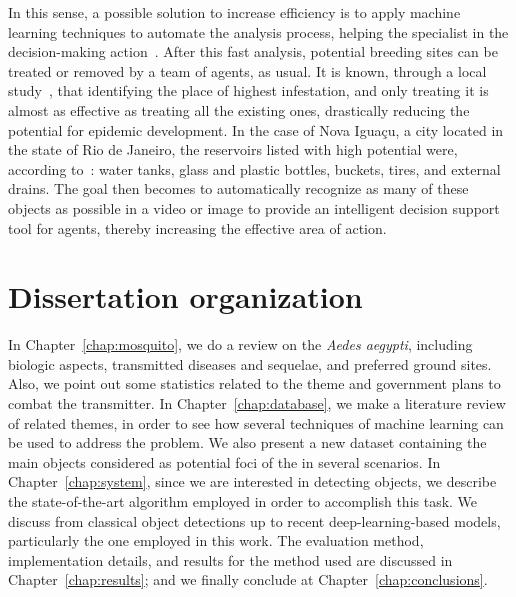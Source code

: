 In this sense, a possible solution to increase efficiency is to apply machine learning techniques to automate the analysis process, helping the specialist in the decision-making action~\cite{casfinal2018}. 
After this fast analysis, potential breeding sites can be treated or removed by a team of agents, as usual. 
It is known, through a local study~\cite{tun2009reducing}, that identifying the place of highest infestation, and only treating it is almost as effective as treating all the existing ones, drastically reducing the potential for epidemic development. 
In the case of Nova Iguaçu, a city located in the state of Rio de Janeiro, the reservoirs listed with high potential were, according to~\cite{Lagrotta2006}: water tanks, glass and plastic bottles, buckets, tires, and external drains. 
The goal then becomes to automatically recognize as many of these objects as possible in a video or image to provide an intelligent decision support tool for agents, thereby increasing the effective area of action.


\section{Dissertation organization}
%
In Chapter~\ref{chap:mosquito}, we do a review on the {\it Aedes aegypti}, including biologic aspects, transmitted diseases and sequelae, and preferred ground sites.
Also, we point out some statistics related to the theme and government plans to combat the transmitter.
In Chapter~\ref{chap:database}, we make a literature review of related themes, in order to see how several techniques of machine learning can be used to address the problem.
We also present a new dataset containing the main objects considered as potential foci of the \Aedes in several scenarios.
In Chapter~\ref{chap:system}, since we are interested in detecting objects, we describe the state-of-the-art algorithm employed in order to accomplish this task.
We discuss from classical object detections up to recent deep-learning-based models, particularly the one employed in this work.
The evaluation method, implementation details, and results for the method used are discussed in Chapter~\ref{chap:results}; and we finally conclude at Chapter~\ref{chap:conclusions}.


